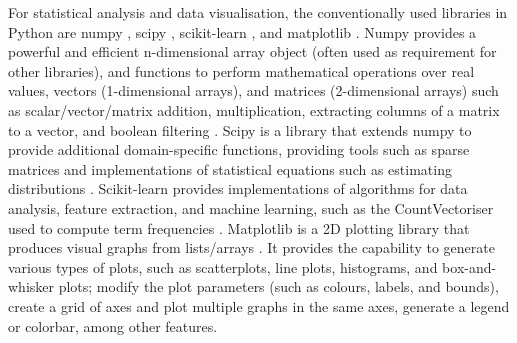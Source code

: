 \documentclass{report}
\begin{document}
For statistical analysis and data visualisation, the conventionally used libraries in Python are numpy \cite{Numpy}, scipy \cite{Scipy}, scikit-learn \cite{Scikit-learn}, and matplotlib \cite{Matplotlib}. 
Numpy provides a powerful and efficient n-dimensional array object (often used as requirement for other libraries), and functions to perform mathematical operations over real values, vectors (1-dimensional arrays), and matrices (2-dimensional arrays) such as scalar/vector/matrix addition, multiplication, extracting columns of a matrix to a vector, and boolean filtering \cite{Numpy}.
Scipy is a library that extends numpy to provide additional domain-specific functions, providing tools such as sparse matrices and implementations of statistical equations such as estimating distributions \cite{Scipy}. 
Scikit-learn provides implementations of algorithms for data analysis, feature extraction, and machine learning, such as the CountVectoriser used to compute term frequencies \cite{Scikit-learn}.
Matplotlib is a 2D plotting library that produces visual graphs from lists/arrays \cite{Matplotlib}.
It provides the capability to generate various types of plots, such as scatterplots, line plots, histograms, and box-and-whisker plots; modify the plot parameters (such as colours, labels, and bounds), create a grid of axes and plot multiple graphs in the same axes, generate a legend or colorbar, among other features.
\end{document}
